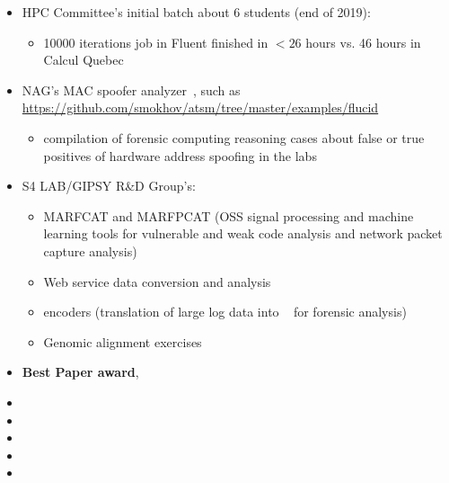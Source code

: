 \documentclass{easychair}
\begin{document}
\begin{itemize}
	\item
	HPC Committee's initial batch about 6 students (end of 2019):
	\begin{itemize}
		\item 10000 iterations job in Fluent finished in $<26$ hours vs. 46 hours in Calcul Quebec
	\end{itemize}

	\item
	NAG's MAC spoofer analyzer~\cite{mac-spoofer-analyzer-intro-c3s2e2014,mac-spoofer-analyzer-detail-fps2014},
	such as \url{https://github.com/smokhov/atsm/tree/master/examples/flucid}
	\begin{itemize}
		\item compilation of forensic computing reasoning cases about false or true positives of hardware address spoofing in the labs
	\end{itemize}

	\item
	S4 LAB/GIPSY R\&D Group's:
	\begin{itemize}
		\item MARFCAT and MARFPCAT (OSS signal processing and machine learning tools for 
		vulnerable and weak code analysis and network packet capture
		analysis)~\cite{marfcat-nlp-ai2014,marfcat-sate2010-nist,fingerprinting-mal-traffic}
		\item Web service data conversion and analysis
		\item {\flucid} encoders (translation of large log data into {\flucid}~\cite{mokhov-phd-thesis-2013} for forensic analysis)
		\item Genomic alignment exercises
	\end{itemize}

	\item \textbf{Best Paper award}, 

	\item {}
	\item {}
 	\item {}
	\item {}
 
	\item {}
 

\end{itemize}
\end{document}
